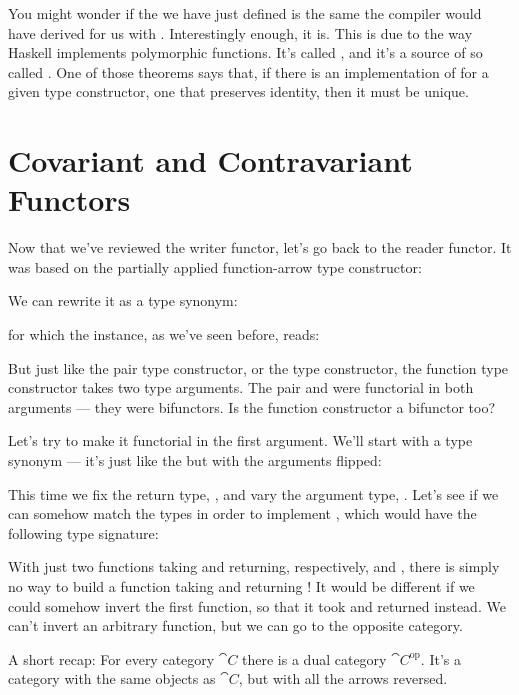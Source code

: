 You might wonder if the  we have just defined is the same
 the compiler would have derived for us with
. Interestingly enough, it is. This is due to
the way Haskell implements polymorphic functions. It's called
, and it's a source of so called
. One of those theorems says that, if there is
an implementation of  for a given type constructor, one
that preserves identity, then it must be unique.

\section{Covariant and Contravariant Functors}

Now that we've reviewed the writer functor, let's go back to the reader
functor. It was based on the partially applied function-arrow type
constructor:

We can rewrite it as a type synonym:

for which the  instance, as we've seen before, reads:

But just like the pair type constructor, or the  type
constructor, the function type constructor takes two type arguments. The
pair and  were functorial in both arguments --- they were
bifunctors. Is the function constructor a bifunctor too?

Let's try to make it functorial in the first argument. We'll start with
a type synonym --- it's just like the  but with the
arguments flipped:

This time we fix the return type, , and vary the argument
type, . Let's see if we can somehow match the types in order
to implement , which would have the following type
signature:

With just two functions taking  and returning, respectively,
 and , there is simply no way to build a function
taking  and returning ! It would be different if we
could somehow invert the first function, so that it took  and
returned  instead. We can't invert an arbitrary function, but
we can go to the opposite category.

A short recap: For every category $\cat{C}$ there is a dual category
$\cat{C}^{\mathrm{op}}$. It's a category with the same objects as
$\cat{C}$, but with all the arrows reversed.

